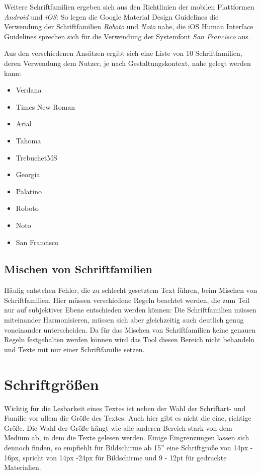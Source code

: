 Weitere Schriftfamilien ergeben sich aus den Richtlinien der mobilen Plattformen \textit{Android} und \textit{iOS}: So legen die Google Material Design Guidelines die Verwendung der Schriftfamilien \textit{Roboto} und \textit{Noto} nahe, die iOS Human Interface Guidelines sprechen sich für die Verwendung der Systemfont \textit{San Francisco} aus.

Aus den verschiedenen Ansätzen ergibt sich eine Liste von 10 Schriftfamilien, deren Verwendung dem Nutzer, je nach Gestaltungskontext, nahe gelegt werden kann:

\begin{itemize}
	\item Verdana
	\item Times New Roman
	\item Arial
	\item Tahoma
	\item TrebuchetMS
	\item Georgia
	\item Palatino
	\item Roboto
	\item Noto
	\item San Francisco
\end{itemize}

\subsection{Mischen von Schriftfamilien}

Häufig entstehen Fehler, die zu schlecht gesetztem Text führen, beim Mischen von Schriftfamilien. Hier müssen verschiedene Regeln beachtet werden, die zum Teil nur auf subjektiver Ebene entschieden werden können: Die Schriftfamilien müssen miteinander Harmonisieren, müssen sich aber gleichzeitig auch deutlich genug voneinander unterscheiden. Da für das Mischen von Schriftfamilien keine genauen Regeln festgehalten werden können wird das Tool diesen Bereich nicht behandeln und Texte mit nur einer Schriftfamilie setzen.


\section{Schriftgrößen}
Wichtig für die Lesbarkeit eines Textes ist neben der Wahl der Schriftart- und Familie vor allem die Größe des Textes. Auch hier gibt es nicht die eine, richtige Größe. Die Wahl der Größe hängt wie alle anderen Bereich stark von dem Medium ab, in dem die Texte gelesen werden.
Einige Eingrenzungen lassen sich dennoch finden, so empfiehlt \cite{Runk200804} für Bildschirme ab 15” eine Schriftgröße von 14px - 16px, \cite{Lehnert201602} spricht von 14px -24px für Bildschirme und 9 - 12pt für gedruckte Materialien.

